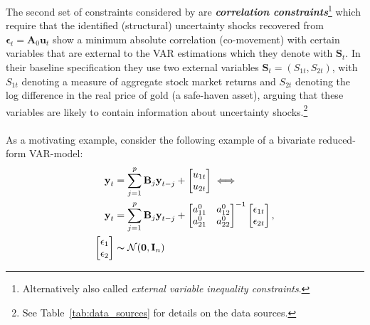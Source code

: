 \documentclass[a4paper,11pt,listof=nochaptergap,oneside,pointednumbers,bibtotoc,bigheadings,liststotoc,hidelinks]{scrbook}
\theoremstyle{mysatz}
\theoremstyle{mydefinition}
\theoremstyle{mytheorem}
\theoremstyle{mybemerkung}
\newcommand{\vect}[1]{\boldsymbol{\mathbf{#1}}}
\begin{document}
The second set of constraints considered by \citet{ludvigsonetal:19} are \textbf{\textit{correlation constraints}}\footnote{Alternatively also called \textit{external variable inequality constraints}.} which require that the identified (structural) uncertainty shocks recovered from $\vect{\epsilon}_t = \vect{A}_0\vect{u}_t$ show a minimum absolute correlation (co-movement) with certain variables that are external to the VAR estimations which they denote with $\vect{S}_t$. In their baseline specification they use two external variables $\vect{S}_t =  (S_{1t}, S_{2t})$, with $S_{1t}$ denoting a measure of aggregate stock market returns and $S_{2t}$ denoting the log difference in the real price of gold (a safe-haven asset), arguing that these variables are likely to contain information about uncertainty shocks.\footnote{See Table~\ref{tab:data_sources} for details on the data sources.}\\
\\
As a motivating example, \citet{ludvigsonetal:17} consider the following example of a bivariate reduced-form VAR-model:
\begin{equation} \label{eq:svar_ludvi12_a}
\begin{split}
	\vect{y}_t & = \sum_{j=1}^{p} \vect{B}_j\vect{y}_{t-j} + 
		\begin{bmatrix}
			u_{1t} \\
			u_{2t}
		\end{bmatrix} \iff \\
\vect{y}_t & = \sum_{j=1}^{p} \vect{B}_j\vect{y}_{t-j} + 	
					\begin{bmatrix}
    			a_{11}^0 &  a_{12}^0 \\
			a_{21}^0 &  a_{22}^0
 			\end{bmatrix}^{-1}
		\begin{bmatrix}
			\epsilon_{1t} \\
			\epsilon_{2t}
		\end{bmatrix},\\
		\begin{bmatrix}
			\epsilon_1 \\
			\epsilon_2
		\end{bmatrix} & \thicksim \mathcal{N}(\vect{0}, \vect{I}_n)
\end{split}								
\end{equation}
\end{document}

